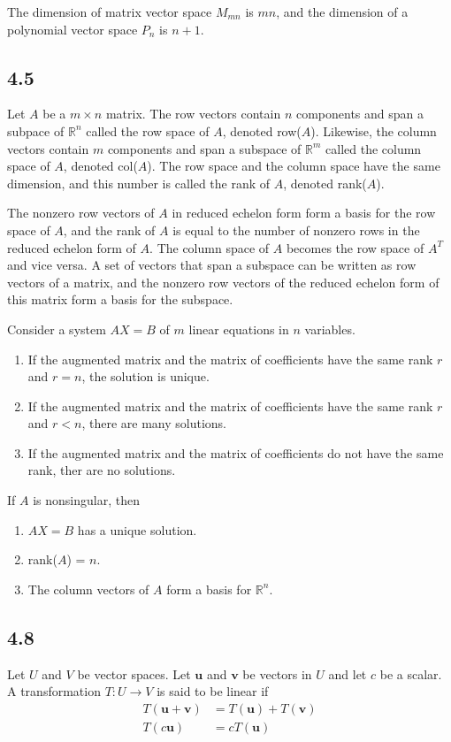 \documentclass{article}
\begin{document}
    The dimension of matrix vector space $M_{mn}$ is $mn$,
    and the dimension of a polynomial vector space $P_n$ is $n + 1$.

    \subsection*{4.5}
    Let $A$ be a $m \times n$ matrix. 
    The row vectors contain $n$ components and span a subpace of $\mathbb{R}^n$ called the row space of $A$,
    denoted row($A$). 
    Likewise, the column vectors contain $m$ components and span a subspace of $\mathbb{R}^m$ called the column space of $A$, 
    denoted col($A$).
    The row space and the column space have the same dimension, 
    and this number is called the rank of $A$, denoted rank($A$).
    
    The nonzero row vectors of $A$ in reduced echelon form form a basis for the row space of $A$,
    and the rank of $A$ is equal to the number of nonzero rows in the reduced echelon form of $A$.
    The column space of $A$ becomes the row space of $A^T$ and vice versa. 
    A set of vectors that span a subspace can be written as row vectors of a matrix, 
    and the nonzero row vectors of the reduced echelon form of this matrix form a basis for the subspace.

    Consider a system $AX = B$ of $m$ linear equations in $n$ variables. 
    \begin{enumerate}
        \item If the augmented matrix and the matrix of coefficients have the same rank $r$
        and $r = n$, the solution is unique.
        \item If the augmented matrix and the matrix of coefficients have the same rank $r$
        and $r < n$, there are many solutions. 
        \item If the augmented matrix and the matrix of coefficients do not have the same rank,
        ther are no solutions. 
    \end{enumerate}

    If $A$ is nonsingular, then 
    \begin{enumerate}
        \item $AX = B$ has a unique solution.
        \item rank($A$) = $n$.
        \item The column vectors of $A$ form a basis for $\mathbb{R}^n$.
    \end{enumerate}

    \subsection*{4.8}
    Let $U$ and $V$ be vector spaces. Let $\mathbf{u}$ and $\mathbf{v}$ be vectors in $U$ 
    and let $c$ be a scalar. A transformation $T: U \rightarrow V$ is said to be linear if 
    \begin{align*}
        T(\mathbf{u} + \mathbf{v}) &= T(\mathbf{u}) + T(\mathbf{v}) \\
        T(c\mathbf{u}) &= cT(\mathbf{u})
    \end{align*}
\end{document}
